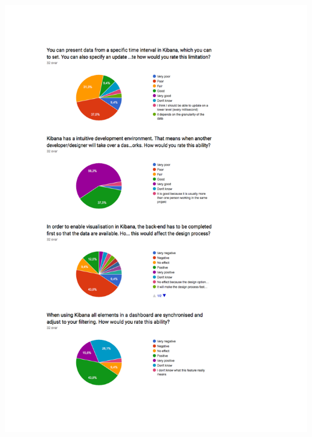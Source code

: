 \documentclass[12pt]{kththesis}
\begin{document}
\begin{appendices}
\includegraphics[width=1\textwidth]{UtvarderingSvar3}
\newpage

\end{appendices}
\end{document}

